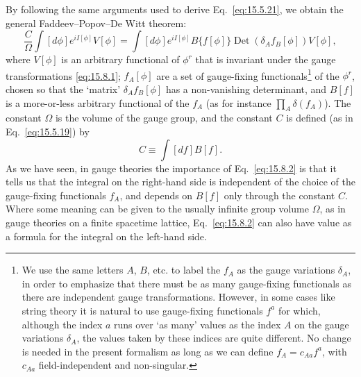 By following the same arguments used to derive Eq.~\eqref{eq:15.5.21}, we obtain the general Faddeev--Popov--De Witt theorem:
\begin{equation}
 \frac{C}{\Omega}\int[d\phi]e^{iI[\phi]}V[\phi]
 =\int[d\phi]e^{iI[\phi]}B\{f[\phi]\}\operatorname{Det}(\delta_Af_B[\phi])V[\phi],
 \tag{15.8.2}\label{eq:15.8.2}
\end{equation}
where $V[\phi]$ is an arbitrary functional of $\phi^r$ that is invariant under the gauge transformations \eqref{eq:15.8.1}; $f_A[\phi]$ are a set of gauge-fixing functionals\footnote{We use the same letters $A$, $B$, etc. to label the $f_A$ as the gauge variations $\delta_A$, in order to emphasize that there must be as many gauge-fixing functionals as there are independent gauge transformations. However, in some cases like string theory it is natural to use gauge-fixing functionals $f^a$ for which, although the index $a$ runs over `as many' values as the index $A$ on the gauge variations $\delta_A$, the values taken by these indices are quite different. No change is needed in the present formalism as long as we can define $f_A=c_{Aa}f^a$, with $c_{Aa}$ field-independent and non-singular.} of the $\phi^r$, chosen so that the `matrix' $\delta_Af_B[\phi]$ has a non-vanishing determinant, and $B[f]$ is a more-or-less arbitrary functional of the $f_A$ (as for instance $\prod_A\delta(f_A)$). The constant $\Omega$ is the volume of the gauge group, and the constant $C$ is defined (as in Eq.~\eqref{eq:15.5.19}) by
\begin{equation}
 C\equiv\int[df]B[f].
 \tag{15.8.3}\label{eq:15.8.3}
\end{equation}
As we have seen, in gauge theories the importance of Eq.~\eqref{eq:15.8.2} is that it tells us that the integral on the right-hand side is independent of the choice of the gauge-fixing functionals $f_A$, and depends on $B[f]$ only through the constant $C$. Where some meaning can be given to the usually infinite group volume $\Omega$, as in gauge theories on a finite spacetime lattice, Eq.~\eqref{eq:15.8.2} can also have value as a formula for the integral on the left-hand side.

